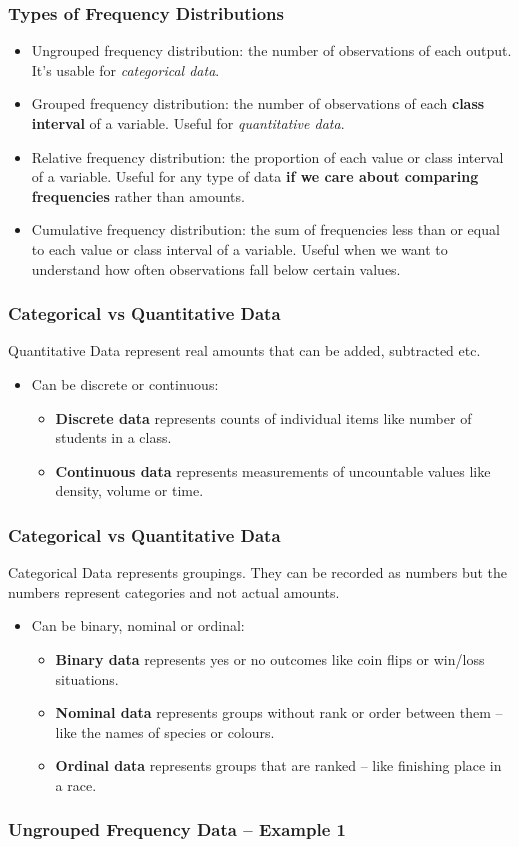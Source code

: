 \documentclass[aspectratio=169,11pt,svgnames,handout]{beamer}
\begin{document}
\begin{frame}
 \frametitle{Types of Frequency Distributions}
 \begin{itemize}[label=\textbullet]
  \item \alert{Ungrouped frequency distribution}: the number of observations of
   each output. It's usable for \emph{categorical data}.
  \pause
  \item \alert{Grouped frequency distribution}: the number of observations of
   each \textbf{class interval} of a variable. Useful for \emph{quantitative
   data}.
  \pause
  \item \alert{Relative frequency distribution}: the proportion of each value or
   class interval of a variable. Useful for any type of data \textbf{if we care
   about comparing frequencies} rather than amounts.
  \pause
  \item \alert{Cumulative frequency distribution}: the sum of frequencies less
   than or equal to each value or class interval of a variable. Useful when we
   want to understand how often observations fall below certain values.
 \end{itemize}
\end{frame}

\begin{frame}
 \frametitle{Categorical vs Quantitative Data}
 \alert{Quantitative Data} represent real amounts that can be added, subtracted
 etc.
 \pause
 \begin{itemize}[label=\textbullet]
  \item Can be discrete or continuous:
  \pause
  \begin{itemize}[label=$\circ$]
   \item \textbf{Discrete data} represents counts of individual items like number of
    students in a class.
   \pause
   \item \textbf{Continuous data} represents measurements of uncountable values like
    density, volume or time.
  \end{itemize}
 \end{itemize}
\end{frame}

\begin{frame}
 \frametitle{Categorical vs Quantitative Data}
 \alert{Categorical Data} represents groupings. They can be recorded as numbers
 but the numbers represent categories and not actual amounts.
 \pause
 \begin{itemize}[label=\textbullet]
  \item Can be binary, nominal or ordinal:
  \pause
  \begin{itemize}[label=$\circ$]
   \item \textbf{Binary data} represents yes or no outcomes like coin flips or
    win/loss situations.
   \pause
   \item \textbf{Nominal data} represents groups without rank or order between
    them -- like the names of species or colours.
   \pause
   \item \textbf{Ordinal data} represents groups that are ranked -- like
    finishing place in a race.
  \end{itemize}
 \end{itemize}
\end{frame}

\begin{frame}
 \frametitle{Ungrouped Frequency Data -- Example 1}
\end{frame}
\end{document}
